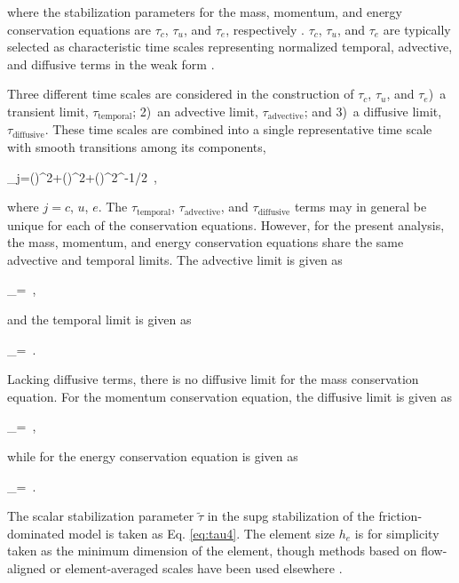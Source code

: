 \noindent where the stabilization parameters for the mass, momentum, and energy conservation equations are \(\tau_c\), \(\tau_u\), and \(\tau_e\), respectively \cite{hauke,tezduyar,hauke_1998,kirk,TH1983,tezduyar1983}. \(\tau_c\), \(\tau_u\), and \(\tau_e\) are typically selected as characteristic time scales representing normalized temporal, advective, and diffusive terms in the weak form \cite{tezduyar}. 

Three different time scales are considered in the construction of \(\tau_c\), \(\tau_u\), and \(\tau_e\))~a transient limit, \(\tau_\text{temporal}\); 2)~an advective limit, \(\tau_\text{advective}\); and 3)~a diffusive limit, \(\tau_\text{diffusive}\). These time scales are combined into a single representative time scale with smooth transitions among its components,

\beq
\label{eq:switchTau}
\tau_j=\left\lbrack\left(\right)^2+\left(\right)^2+\left(\right)^2\right\rbrack^{-1/2}\ ,
\eeq

\noindent where \(j=c\), \(u\), \(e\). The \(\tau_\text{temporal}\), \(\tau_\text{advective}\), and \(\tau_\text{diffusive}\) terms may in general be unique for each of the conservation equations. However, for the present analysis, the mass, momentum, and energy conservation equations share the same advective and temporal limits. The advective limit is given as

\beq
\label{eq:tau1}
\tau_=\ ,
\eeq

\noindent and the temporal limit is given as

\beq
\label{eq:tau2}
\tau_=\ .
\eeq

\noindent Lacking diffusive terms, there is no diffusive limit for the mass conservation equation. For the momentum conservation equation, the diffusive limit is given as

\beq
\label{eq:tau3}
\tau_=\ ,
\eeq

\noindent while for the energy conservation equation is given as

\beq
\label{eq:tau4}
\tau_=\ .
\eeq

\noindent The scalar stabilization parameter \(\tilde{\tau}\) in the \gls{supg} stabilization of the friction-dominated model is taken as Eq. \eqref{eq:tau4}. The element size \(h_e\) is for simplicity taken as the minimum dimension of the element, though methods based on flow-aligned or element-averaged scales have been used elsewhere \cite{hauke_1998,hauke,tezduyar1983,tezduyar}. 


